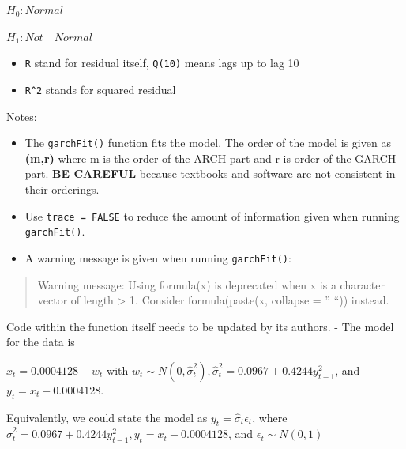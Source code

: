 \documentclass[
]{book}
\providecommand{\tightlist}{%
  \setlength{\itemsep}{0pt}\setlength{\parskip}{0pt}}
\theoremstyle{definition}
\theoremstyle{definition}
\theoremstyle{definition}
\theoremstyle{definition}
\theoremstyle{remark}
\begin{document}
\(H_0: Normal\)

\(H_1: Not \quad Normal\)

\begin{itemize}
\item
  \texttt{R} stand for residual itself, \texttt{Q(10)} means lags up to lag 10
\item
  \texttt{R\^{}2} stands for squared residual
\end{itemize}

Notes:

\begin{itemize}
\tightlist
\item
  The \texttt{garchFit()} function fits the model. The order of the model is given as \textbf{(m,r)} where m is the order of the ARCH part and r is order of the GARCH part. \textbf{BE CAREFUL} because textbooks and software are not consistent in their orderings.
\item
  Use \texttt{trace\ =\ FALSE} to reduce the amount of information given when running \texttt{garchFit()}.
\item
  A warning message is given when running \texttt{garchFit()}:
\end{itemize}

\begin{quote}
Warning message:
Using formula(x) is deprecated when x is a character vector of length \textgreater{} 1.
Consider formula(paste(x, collapse = '' ``)) instead.
\end{quote}

Code within the function itself needs to be updated by its authors.
- The model for the data is

\(x_t=0.0004128+w_t\) with \(w_t\sim N(0, \hat \sigma^2_t), \hat \sigma_t^2=0.0967+0.4244y^2_{t-1}\), and \(y_t = x_t - 0.0004128\).

Equivalently, we could state the model as \(y_t=\hat \sigma_t\epsilon_t\), where \(\hat \sigma^2_t=0.0967+0.4244y^2_{t-1}, y_t=x_t-0.0004128\), and \(\epsilon_t\sim N(0,1)\)
\end{document}
